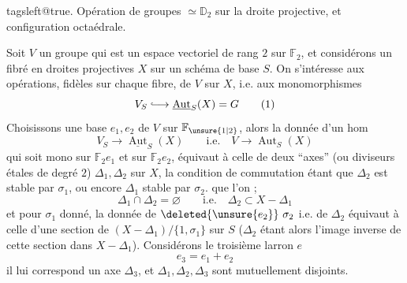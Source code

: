 \begingroup\csname tagsleft@true. Opération de groupes \(\simeq\mathbb D_2\) sur la droite projective, et configuration octaédrale.

Soit \(V\) un groupe qui est un espace vectoriel de rang \(2\) sur \(\mathbb F_2\),  et considérons un fibré en droites projectives \(X\) sur un schéma de base \(S\). On s'intéresse aux opérations, fidèles sur chaque fibre, de \(V\) sur \(X\), i.e. aux monomorphismes
\[
V_S\lhook\joinrel\longrightarrow\underline{\operatorname{Aut}}_S(X)=G \tag*{(1)}
\]
Choisissons une base \(e_1,e_2\) de \(V\) sur \(\mathbb F_{\unsure{1|2}}\), alors la donnée d'un hom
\[
V_S\longrightarrow\underline{\operatorname{Aut}}_S(X)\qquad\text{i.e.}\quad V\longrightarrow\operatorname{Aut}_S(X)
\]
qui soit mono sur \(\mathbb F_2 e_1\) et sur \(\mathbb F_2 e_2\), équivaut à celle de  deux ``axes'' (ou diviseurs étales de degré \(2\)) \(\Delta_1,\Delta_2\) sur \(X\), la condition de commutation étant que \(\Delta_2\) est stable par \(\sigma_1\), ou  encore \(\Delta_1\) stable par \(\sigma_2\).
    que l'on ; 
\[
\Delta_1\cap\Delta_2=\varnothing\qquad\text{i.e.}\quad\Delta_2\subset X-\Delta_1 \tag*{(2)}
\]
et pour \(\sigma_1\)  donné, la donnée de \(\deleted{\unsure{e_2}}\ \sigma_2\) i.e. de \(\Delta_2\) équivaut à celle d'une section de  \((X-\Delta_1)/\{1,\sigma_1\}\) sur \(S\) (\(\Delta_2\) étant alors l'image inverse de cette section dans \(X-\Delta_1\)). Considérons le troisième larron \(e\)
\[
e_3=e_1+e_2 \tag*{(3)}
\]
il lui correspond un axe \(\Delta_3\), et \(\Delta_1,\Delta_2,\Delta_3\) sont mutuellement disjoints.
\endgroup
